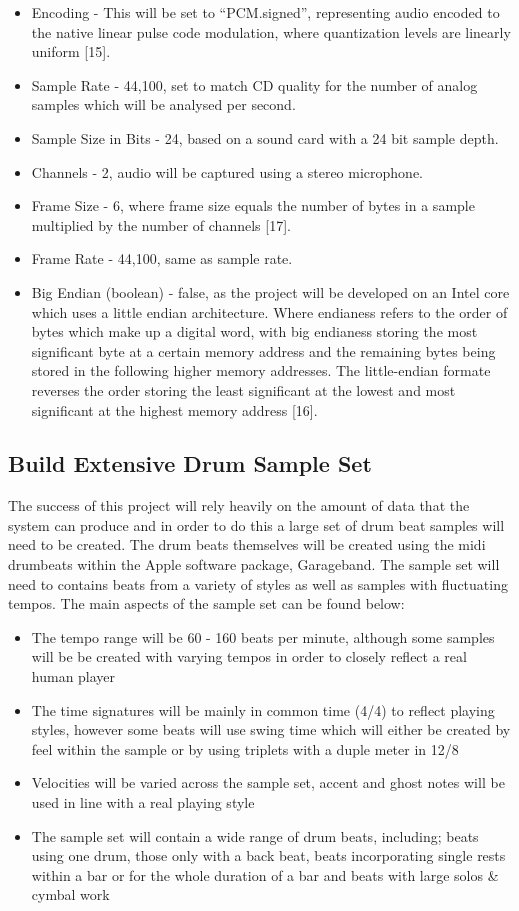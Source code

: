 \documentclass[a4paper, 11pt]{article}
\begin{document}
\begin{itemize}
\item Encoding - This will be set to ``PCM.signed'', representing audio encoded to the native linear pulse code modulation, where quantization levels are linearly uniform [15].
\item Sample Rate - 44,100, set to match CD quality for the number of analog samples which will be analysed per second. 
\item Sample Size in Bits - 24, based on a sound card with a 24 bit sample depth.
\item Channels - 2, audio will be captured using a stereo microphone.
\item Frame Size - 6, where frame size equals the number of bytes in a sample multiplied by the number of channels [17].
\item Frame Rate - 44,100, same as sample rate.
\item Big Endian (boolean) - false, as the project will be developed on an Intel core which uses a little endian architecture. Where endianess refers to the order of bytes which make up a digital word, with big endianess storing the most significant byte at a certain memory address and the remaining bytes being stored in the following higher memory addresses. The little-endian formate reverses the order storing the least significant at the lowest and most significant at the highest memory address [16].
\end{itemize}


\subsection{Build Extensive Drum Sample Set}
The success of this project will rely heavily on the amount of data that the system can produce and in order to do this a large set of drum beat samples will need to be created. The drum beats themselves will be created using the midi drumbeats within the Apple software package, Garageband. The sample set will need to contains beats from a variety of styles as well as samples with fluctuating tempos. The main aspects of the sample set can be found below:

\begin{itemize}
\item The tempo range will be 60 - 160 beats per minute, although some samples will be be created with varying tempos in order to closely reflect a real human player
\item The time signatures will be mainly in common time (4/4) to reflect playing styles, however some beats will use swing time which will either be created by feel within the sample or by using triplets with a duple meter in 12/8
\item Velocities will be varied across the sample set, accent and ghost notes will be used in line with a real playing style
\item The sample set will contain a wide range of drum beats, including; beats using one drum, those only with a back beat, beats incorporating single rests within a bar or for the whole duration of a bar and beats with large solos \& cymbal work
\end{itemize} 
\end{document}
